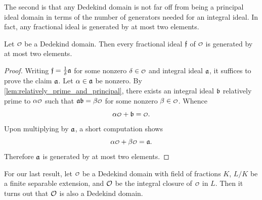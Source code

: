     The second is that any Dedekind domain is not far off from being a principal ideal domain in terms of the number of generators needed for an integral ideal. In fact, any fractional ideal is generated by at most two elements.

    \begin{proposition}\label{prop:fractional_ideal_generated_by_two_elements}
      Let \(\smc{O}\) be a Dedekind domain. Then every fractional ideal \(\mathfrak{f}\) of \(\smc{O}\) is generated by at most two elements.
    \end{proposition}
    \begin{proof}
      Writing \(\mathfrak{f} = \frac{1}{\delta}\mathfrak{a}\) for some nonzero \(\d \in \smc{O}\) and integral ideal \(\mathfrak{a}\), it suffices to prove the claim \(\mathfrak{a}\). Let \(\alpha \in \mathfrak{a}\) be nonzero. By \cref{lem:relatively_prime_and_principal}, there exists an integral ideal \(\mathfrak{b}\) relatively prime to \(\a\smc{O}\) such that \(\mf{a}\mf{b} = \b\smc{O}\) for some nonzero \(\b \in \smc{O}\). Whence
      \[
        \a\smc{O}+\mf{b} = \smc{O}.
      \]
      Upon multiplying by \(\mathfrak{a}\), a short computation shows
      \[
        \a\smc{O}+\b\smc{O} = \mf{a}. 
      \]
      Therefore \(\mathfrak{a}\) is generated by at most two elements.
    \end{proof}

    For our last result, let \(\smc{O}\) be a Dedekind domain with field of fractions \(K\), \(L/K\) be a finite separable extension, and \(\mathcal{O}\) be the integral closure of \(\smc{O}\) in \(L\). Then it turns out that \(\mathcal{O}\) is also a Dedekind domain.

